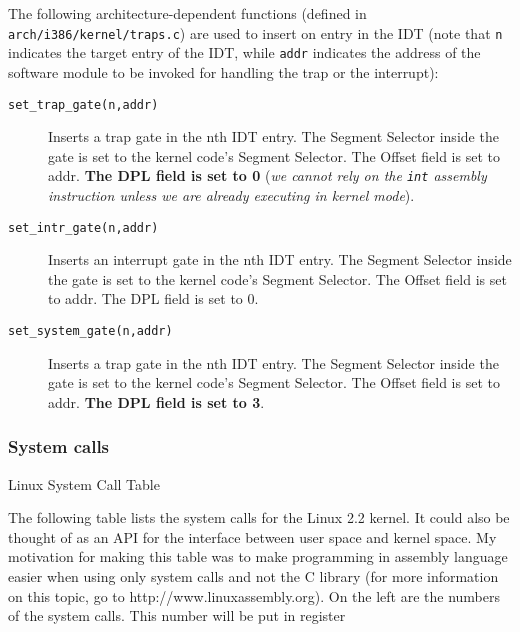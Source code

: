 \documentclass[10pt,a4paper]{article}
\begin{document}
The following architecture-dependent functions (defined in \texttt{arch/i386/kernel/traps.c}) are used to insert on entry in the IDT (note that \texttt{n} indicates the target entry of the IDT, while \texttt{addr} indicates the address of the software module to be invoked for handling the trap or the interrupt):
\begin{description} 
\item[\texttt{set\_trap\_gate(n,addr)}] Inserts a trap gate in the nth IDT entry. The Segment Selector inside the gate is set to the kernel code’s Segment Selector. The Offset field is set to addr. \textbf{The DPL field is set to 0} (\textit{we cannot rely on the \texttt{int} assembly instruction unless we are already executing in kernel mode}).
\item[\texttt{set\_intr\_gate(n,addr)}] Inserts an interrupt gate in the nth IDT entry. The Segment Selector inside the gate is set to the kernel code's Segment Selector. The Offset field is set to addr. The DPL field is set to 0.
\item[\texttt{set\_system\_gate(n,addr)}] Inserts a trap gate in the nth IDT entry. The Segment Selector inside the gate is set to the kernel code's Segment Selector. The Offset field is set to addr. \textbf{The DPL field is set to 3}.
\end{description}









\subsubsection{System calls}

Linux System Call Table

The following table lists the system calls for the Linux 2.2 kernel. It could also be thought of as an API for the interface between user space and kernel space. My motivation for making this table was to make programming in assembly language easier when using only system calls and not the C library (for more information on this topic, go to http://www.linuxassembly.org). On the left are the numbers of the system calls. This number will be put in register %
\end{document}
